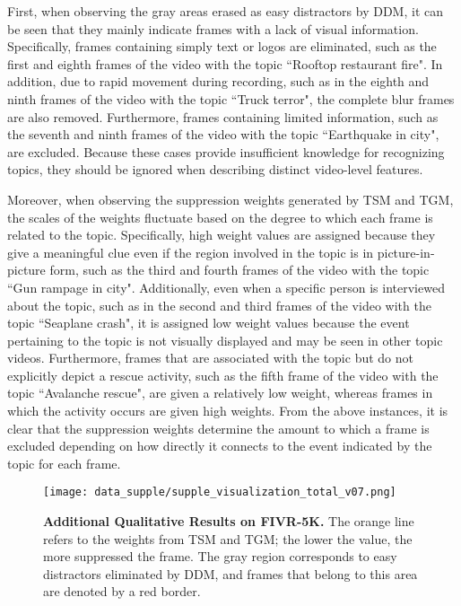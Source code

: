 \documentclass[10pt,twocolumn,letterpaper]{article}
\begin{document}
        First, when observing the gray areas erased as easy distractors by DDM, it can be seen that they mainly indicate frames with a lack of visual information. Specifically, frames containing simply text or logos are eliminated, such as the first and eighth frames of the video with the topic ``Rooftop restaurant fire". In addition, due to rapid movement during recording, such as in the eighth and ninth frames of the video with the topic ``Truck terror", the complete blur frames are also removed. Furthermore, frames containing limited information, such as the seventh and ninth frames of the video with the topic ``Earthquake in city", are excluded. Because these cases provide insufficient knowledge for recognizing topics, they should be ignored when describing distinct video-level features.

        Moreover, when observing the suppression weights generated by TSM and TGM, the scales of the weights fluctuate based on the degree to which each frame is related to the topic. Specifically, high weight values are assigned because they give a meaningful clue even if the region involved in the topic is in picture-in-picture form, such as the third and fourth frames of the video with the topic ``Gun rampage in city". Additionally, even when a specific person is interviewed about the topic, such as in the second and third frames of the video with the topic ``Seaplane crash", it is assigned low weight values because the event pertaining to the topic is not visually displayed and may be seen in other topic videos. Furthermore, frames that are associated with the topic but do not explicitly depict a rescue activity, such as the fifth frame of the video with the topic ``Avalanche rescue", are given a relatively low weight, whereas frames in which the activity occurs are given high weights. From the above instances, it is clear that the suppression weights determine the amount to which a frame is excluded depending on how directly it connects to the event indicated by the topic for each frame.

    \begin{figure*}[t]
        \centering
        \texttt{[image: data\_supple/supple\_visualization\_total\_v07.png]} 
        \caption{\textbf{Additional Qualitative Results on FIVR-5K.} The orange line refers to the weights from TSM and TGM; the lower the value, the more suppressed the frame. The gray region corresponds to easy distractors eliminated by DDM, and frames that belong to this area are denoted by a red border.} \label{fig:add_qual}
    \end{figure*}
\end{document}
